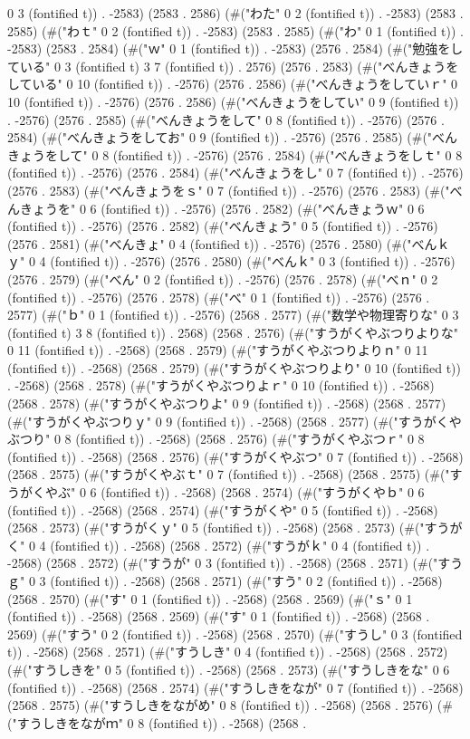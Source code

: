 0 3 (fontified t)) . -2583) (2583 . 2586) (#("わた" 0 2 (fontified t)) . -2583) (2583 . 2585) (#("わｔ" 0 2 (fontified t)) . -2583) (2583 . 2585) (#("わ" 0 1 (fontified t)) . -2583) (2583 . 2584) (#("ｗ" 0 1 (fontified t)) . -2583) (2576 . 2584) (#("勉強をしている" 0 3 (fontified t) 3 7 (fontified t)) . 2576) (2576 . 2583) (#("べんきょうをしている" 0 10 (fontified t)) . -2576) (2576 . 2586) (#("べんきょうをしていｒ" 0 10 (fontified t)) . -2576) (2576 . 2586) (#("べんきょうをしてい" 0 9 (fontified t)) . -2576) (2576 . 2585) (#("べんきょうをして" 0 8 (fontified t)) . -2576) (2576 . 2584) (#("べんきょうをしてお" 0 9 (fontified t)) . -2576) (2576 . 2585) (#("べんきょうをして" 0 8 (fontified t)) . -2576) (2576 . 2584) (#("べんきょうをしｔ" 0 8 (fontified t)) . -2576) (2576 . 2584) (#("べんきょうをし" 0 7 (fontified t)) . -2576) (2576 . 2583) (#("べんきょうをｓ" 0 7 (fontified t)) . -2576) (2576 . 2583) (#("べんきょうを" 0 6 (fontified t)) . -2576) (2576 . 2582) (#("べんきょうｗ" 0 6 (fontified t)) . -2576) (2576 . 2582) (#("べんきょう" 0 5 (fontified t)) . -2576) (2576 . 2581) (#("べんきょ" 0 4 (fontified t)) . -2576) (2576 . 2580) (#("べんｋｙ" 0 4 (fontified t)) . -2576) (2576 . 2580) (#("べんｋ" 0 3 (fontified t)) . -2576) (2576 . 2579) (#("べん" 0 2 (fontified t)) . -2576) (2576 . 2578) (#("べｎ" 0 2 (fontified t)) . -2576) (2576 . 2578) (#("べ" 0 1 (fontified t)) . -2576) (2576 . 2577) (#("ｂ" 0 1 (fontified t)) . -2576) (2568 . 2577) (#("数学や物理寄りな" 0 3 (fontified t) 3 8 (fontified t)) . 2568) (2568 . 2576) (#("すうがくやぶつりよりな" 0 11 (fontified t)) . -2568) (2568 . 2579) (#("すうがくやぶつりよりｎ" 0 11 (fontified t)) . -2568) (2568 . 2579) (#("すうがくやぶつりより" 0 10 (fontified t)) . -2568) (2568 . 2578) (#("すうがくやぶつりよｒ" 0 10 (fontified t)) . -2568) (2568 . 2578) (#("すうがくやぶつりよ" 0 9 (fontified t)) . -2568) (2568 . 2577) (#("すうがくやぶつりｙ" 0 9 (fontified t)) . -2568) (2568 . 2577) (#("すうがくやぶつり" 0 8 (fontified t)) . -2568) (2568 . 2576) (#("すうがくやぶつｒ" 0 8 (fontified t)) . -2568) (2568 . 2576) (#("すうがくやぶつ" 0 7 (fontified t)) . -2568) (2568 . 2575) (#("すうがくやぶｔ" 0 7 (fontified t)) . -2568) (2568 . 2575) (#("すうがくやぶ" 0 6 (fontified t)) . -2568) (2568 . 2574) (#("すうがくやｂ" 0 6 (fontified t)) . -2568) (2568 . 2574) (#("すうがくや" 0 5 (fontified t)) . -2568) (2568 . 2573) (#("すうがくｙ" 0 5 (fontified t)) . -2568) (2568 . 2573) (#("すうがく" 0 4 (fontified t)) . -2568) (2568 . 2572) (#("すうがｋ" 0 4 (fontified t)) . -2568) (2568 . 2572) (#("すうが" 0 3 (fontified t)) . -2568) (2568 . 2571) (#("すうｇ" 0 3 (fontified t)) . -2568) (2568 . 2571) (#("すう" 0 2 (fontified t)) . -2568) (2568 . 2570) (#("す" 0 1 (fontified t)) . -2568) (2568 . 2569) (#("ｓ" 0 1 (fontified t)) . -2568) (2568 . 2569) (#("す" 0 1 (fontified t)) . -2568) (2568 . 2569) (#("すう" 0 2 (fontified t)) . -2568) (2568 . 2570) (#("すうし" 0 3 (fontified t)) . -2568) (2568 . 2571) (#("すうしき" 0 4 (fontified t)) . -2568) (2568 . 2572) (#("すうしきを" 0 5 (fontified t)) . -2568) (2568 . 2573) (#("すうしきをな" 0 6 (fontified t)) . -2568) (2568 . 2574) (#("すうしきをなが" 0 7 (fontified t)) . -2568) (2568 . 2575) (#("すうしきをながめ" 0 8 (fontified t)) . -2568) (2568 . 2576) (#("すうしきをながｍ" 0 8 (fontified t)) . -2568) (2568 . 
